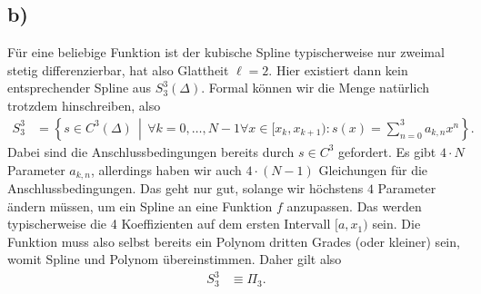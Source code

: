 \documentclass[english, parskip=full]{scrartcl}
\newcommand{\klammer}{}
\begin{document}
\subsection*{b)}
Für eine beliebige Funktion ist der kubische Spline typischerweise nur zweimal stetig differenzierbar, hat also Glattheit $\ell=2$. 
Hier existiert dann kein entsprechender Spline aus $S^3_3(\Delta)$.
Formal können wir die Menge natürlich trotzdem hinschreiben, also
\begin{align}
S^3_3 &= \klammer\left\{ s\in C^3(\Delta)\,\middle\vert\, \forall k=0,\dots,N-1\forall x\in [x_k,x_{k+1}): s(x) = \sum_{n=0}^3 a_{k,n} x^n \right\}.
\end{align}
Dabei sind die Anschlussbedingungen bereits durch $s\in C^3$ gefordert.
Es gibt $4\cdot N$ Parameter $a_{k,n}$, allerdings haben wir auch $4\cdot (N-1)$ Gleichungen für die Anschlussbedingungen.
Das geht nur gut, solange wir höchstens $4$ Parameter ändern müssen, um ein Spline an eine Funktion $f$ anzupassen.
Das werden typischerweise die 4 Koeffizienten auf dem ersten Intervall $[a,x_1)$ sein.
Die Funktion muss also selbst bereits ein Polynom dritten Grades (oder kleiner) sein, womit Spline und Polynom übereinstimmen.
Daher gilt also
\begin{align}
S_3^3 &\equiv \Pi_3.
\end{align}


\newpage
\end{document}
